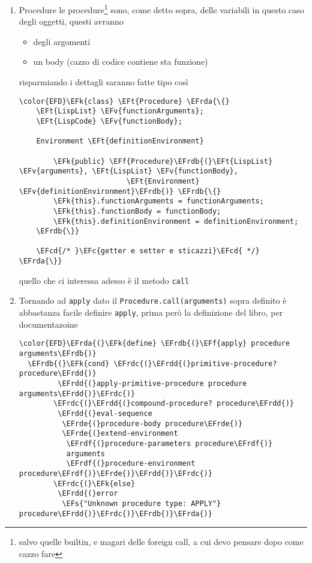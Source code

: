 \documentclass[11pt]{article}
\newcommand{\EFc}[1]{\textcolor{EFc}{#1}} %
\newcommand{\EFcd}[1]{\textcolor{EFcd}{#1}} %
\newcommand{\EFs}[1]{\textcolor{EFs}{#1}} %
\newcommand{\EFk}[1]{\textcolor{EFk}{#1}} %
\newcommand{\EFf}[1]{\textcolor{EFf}{#1}} %
\newcommand{\EFv}[1]{\textcolor{EFv}{#1}} %
\newcommand{\EFt}[1]{\textcolor{EFt}{#1}} %
\newcommand{\EFrda}[1]{\textcolor{EFrda}{#1}} %
\newcommand{\EFrdb}[1]{\textcolor{EFrdb}{#1}} %
\newcommand{\EFrdc}[1]{\textcolor{EFrdc}{#1}} %
\newcommand{\EFrdd}[1]{\textcolor{EFrdd}{#1}} %
\newcommand{\EFrde}[1]{\textcolor{EFrde}{#1}} %
\newcommand{\EFrdf}[1]{\textcolor{EFrdf}{#1}} %
\begin{document}
\begin{enumerate}
\item Procedure
\label{sec:orgdc104bb}
le procedure\footnote{salvo quelle builtin, e magari delle foreign call, a cui devo pensare dopo come cazzo fare} sono, come detto sopra, delle variabili in questo caso degli oggetti, questi avranno
\begin{itemize}
\item degli argomenti
\item un body (cazzo di codice contiene sta funzione)
\end{itemize}

risparmiando i dettagli saranno fatte tipo così
\begin{Code}
\begin{Verbatim}
\color{EFD}\EFk{class} \EFt{Procedure} \EFrda{\{}
    \EFt{LispList} \EFv{functionArguments};
    \EFt{LispCode} \EFv{functionBody};

    Environment \EFt{definitionEnvironment}

        \EFk{public} \EFf{Procedure}\EFrdb{(}\EFt{LispList} \EFv{arguments}, \EFt{LispList} \EFv{functionBody},
                         \EFt{Environment} \EFv{definitionEnvironment}\EFrdb{)} \EFrdb{\{}
        \EFk{this}.functionArguments = functionArguments;
        \EFk{this}.functionBody = functionBody;
        \EFk{this}.definitionEnvironment = definitionEnvironment;
    \EFrdb{\}}

    \EFcd{/* }\EFc{getter e setter e sticazzi}\EFcd{ */}
\EFrda{\}}
\end{Verbatim}
\end{Code}

quello che ci interessa adesso è il metodo \texttt{call}

\item Tornando ad \texttt{apply}
\label{sec:org3f4825d}
dato il \texttt{Procedure.call(arguments)} sopra definito è abbastanza facile definire \texttt{apply}, prima però la definizione del libro, per documentazoine

\begin{Code}
\begin{Verbatim}
\color{EFD}\EFrda{(}\EFk{define} \EFrdb{(}\EFf{apply} procedure arguments\EFrdb{)}
  \EFrdb{(}\EFk{cond} \EFrdc{(}\EFrdd{(}primitive-procedure? procedure\EFrdd{)}
         \EFrdd{(}apply-primitive-procedure procedure arguments\EFrdd{)}\EFrdc{)}
        \EFrdc{(}\EFrdd{(}compound-procedure? procedure\EFrdd{)}
         \EFrdd{(}eval-sequence
          \EFrde{(}procedure-body procedure\EFrde{)}
          \EFrde{(}extend-environment
           \EFrdf{(}procedure-parameters procedure\EFrdf{)}
           arguments
           \EFrdf{(}procedure-environment procedure\EFrdf{)}\EFrde{)}\EFrdd{)}\EFrdc{)}
        \EFrdc{(}\EFk{else}
         \EFrdd{(}error
          \EFs{"Unknown procedure type: APPLY"} procedure\EFrdd{)}\EFrdc{)}\EFrdb{)}\EFrda{)}
\end{Verbatim}
\end{Code}


\end{enumerate}
\end{document}
